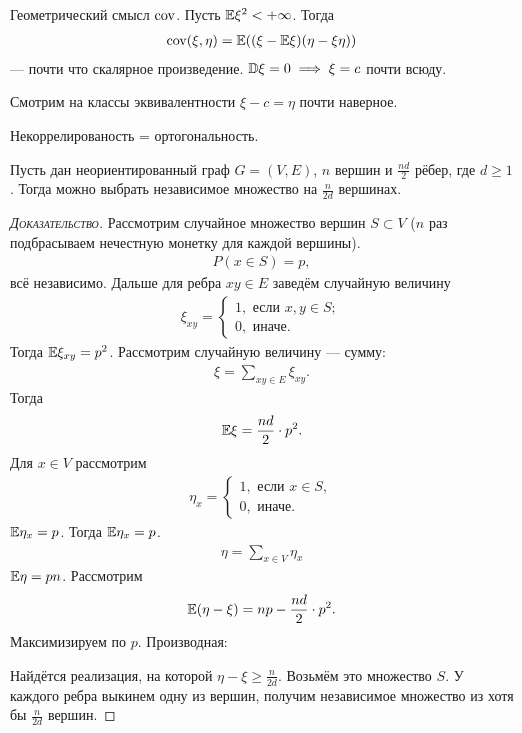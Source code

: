 \documentclass[../main.tex]{subfiles}
\begin{document}
Геометрический смысл $\mathrm{cov}$. Пусть $ \mathbb E \xi^{2} < +\infty $. Тогда
\begin{align*}
 \mathrm{cov}(\xi,\eta) = \mathbb E((\xi - \mathbb E\xi)(\eta - \xi\eta))
\end{align*} --- почти что скалярное произведение. $ \mathbb D\xi = 0 \implies \xi = c $ почти всюду.

Смотрим на классы эквивалентности $ \xi - c = \eta$ почти наверное.

Некоррелированость = ортогональность.

\begin{exmpl}
 Пусть дан неориентированный граф $ G = (V,E) $, $ n $ вершин и $ \frac{nd}{2} $ рёбер, где $ d \geqslant 1 $. Тогда можно выбрать независимое множество на $ \frac{n}{2d} $ вершинах.
\end{exmpl}
\begin{proof}[\normalfont\textsc{Доказательство}]
 Рассмотрим случайное множество вершин $ S \subset V $ ($ n $ раз подбрасываем нечестную монетку для каждой вершины).
 \begin{align*}
  P(x \in S) = p,
 \end{align*} всё независимо. Дальше для ребра $ xy \in E $ заведём случайную величину
 \begin{align*}
  \xi_{xy} = \begin{cases}
   1, \text{ если } x, y \in S; \\
   0, \text{ иначе. }
  \end{cases} 
 \end{align*} Тогда $ \mathbb E\xi_{xy} = p^{2} $. Рассмотрим случайную величину --- сумму:
 \begin{align*}
  \xi = \sum_{xy \in E}\xi_{xy}.
 \end{align*} Тогда
 \begin{align*}
  \mathbb E\xi = \frac{nd}{2} \cdot p^{2}
 .\end{align*} Для $ x \in V $ рассмотрим
 \begin{align*}
  \eta_x = \begin{cases}
   1, \text{ если } x \in S, \\
   0, \text{ иначе. }
  \end{cases} 
 \end{align*} $ \mathbb E\eta_x = p $. Тогда $ \mathbb E\eta_x = p $.
 \begin{align*}
  \eta = \sum_{x \in V} \eta_x
 \end{align*} $ \mathbb E\eta = pn $. Рассмотрим
 \begin{align*}
  \mathbb E(\eta - \xi) = np - \frac{nd}{2} \cdot p^{2}.
 \end{align*} Максимизируем по $ p $. Производная:

 Найдётся реализация, на которой $ \eta - \xi \geqslant \frac{n}{2d} $. Возьмём это множество $ S $. У каждого ребра выкинем одну из вершин, получим независимое множество из хотя бы $ \frac{n}{2d} $ вершин.
\end{proof}
\end{document}
